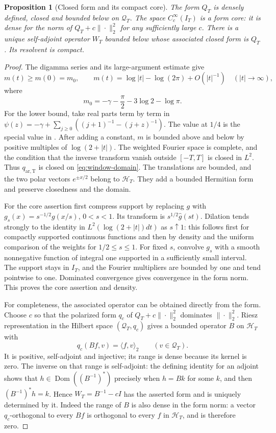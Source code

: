 \documentclass[11pt]{article}
\newtheorem{proposition}[theorem]{Proposition}
\theoremstyle{definition}
\theoremstyle{remark}
\numberwithin{equation}{section}
\begin{document}
\begin{proposition}[Closed form and its compact core]
\label{prop:window-closed}
The form $Q_T$ is densely defined, closed and bounded below on
$\mathcal Q_T$.  The space $C_c^\infty(I_T)$ is a form core: it is
dense for the norm of $Q_T+c\|\cdot\|_2^2$ for any sufficiently
large $c$.  There is a unique self-adjoint operator $W_T$ bounded
below whose associated closed form is $Q_T$.  Its resolvent is compact.
\end{proposition}
\begin{proof}
The digamma series and its large-argument estimate give
\[
 m(t)\ge m(0)=m_0,
 \qquad m(t)=\log|t|-\log(2\pi)+O(|t|^{-1})\quad(|t|\to\infty),
\]
where
\begin{equation}
 m_0=-\gamma-\frac\pi2-3\log2-\log\pi.
 \label{eq:window-mzero}
\end{equation}
For the lower bound, take real parts term by term in
$\psi(z)=-\gamma+\sum_{j\ge0}((j+1)^{-1}-(j+z)^{-1})$.
The value at $1/4$ is the special value in \cite[\S5.4(ii)]{DLMF}.
After adding a constant, $m$ is bounded above and below by positive
multiples of $\log(2+|t|)$.  The weighted Fourier space is complete,
and the condition that the inverse transform vanish outside
$[-T,T]$ is closed in $L^2$.  Thus $q_{\mathrm{ar,T}}$ is closed on
\eqref{eq:window-domain}.  The translations are bounded, and the
two polar vectors $e^{\pm x/2}$ belong to $\mathcal H_T$.
They add a bounded Hermitian form and preserve closedness and the domain.

For the core assertion first compress support by replacing $g$ with
$g_s(x)=s^{-1/2}g(x/s)$, $0<s<1$.  Its transform is
$s^{1/2}\widehat g(st)$.  Dilation tends strongly to the identity
in $L^2(\log(2+|t|)dt)$ as $s\uparrow1$: this follows first for
compactly supported continuous functions and then by density and the
uniform comparison of the weights for $1/2\le s\le1$.
For fixed $s$, convolve $g_s$ with a smooth nonnegative function of
integral one supported in a sufficiently small interval.  The support
stays in $I_T$, and the Fourier multipliers are bounded by one and
tend pointwise to one.  Dominated convergence gives convergence in
the form norm.  This proves the core assertion and density.

For completeness, the associated operator can be obtained directly
from the form.  Choose $c$ so that the polarized form $q_c$ of
$Q_T+c\|\cdot\|_2^2$ dominates $\|\cdot\|_2^2$.  Riesz
representation in the Hilbert space $(\mathcal Q_T,q_c)$ gives a
bounded operator $B$ on $\mathcal H_T$ with
\[
 q_c(Bf,v)=\langle f,v\rangle_2\qquad(v\in\mathcal Q_T).
\]
It is positive, self-adjoint and injective; its range is dense because
its kernel is zero.  The inverse on that range is self-adjoint:
the defining identity for an adjoint shows that
$h\in\operatorname{Dom}((B^{-1})^*)$ precisely when $h=Bk$ for
some $k$, and then $(B^{-1})^*h=k$.  Hence $W_T=B^{-1}-cI$
has the asserted form and is uniquely determined by it.
Indeed the range of $B$ is also dense in the form norm: a vector
$q_c$-orthogonal to every $Bf$ is orthogonal to every $f$ in
$\mathcal H_T$, and is therefore zero.


\end{proof}
\end{document}

